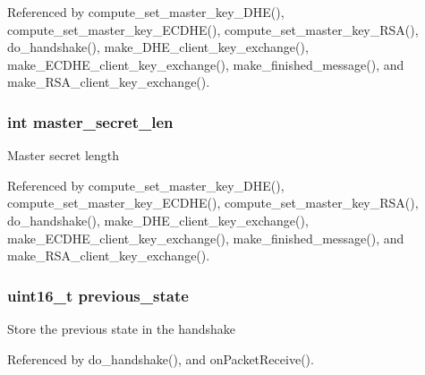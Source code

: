 Referenced by compute\+\_\+set\+\_\+master\+\_\+key\+\_\+\+D\+H\+E(), compute\+\_\+set\+\_\+master\+\_\+key\+\_\+\+E\+C\+D\+H\+E(), compute\+\_\+set\+\_\+master\+\_\+key\+\_\+\+R\+S\+A(), do\+\_\+handshake(), make\+\_\+\+D\+H\+E\+\_\+client\+\_\+key\+\_\+exchange(), make\+\_\+\+E\+C\+D\+H\+E\+\_\+client\+\_\+key\+\_\+exchange(), make\+\_\+finished\+\_\+message(), and make\+\_\+\+R\+S\+A\+\_\+client\+\_\+key\+\_\+exchange().

\subsubsection[{\texorpdfstring{master\+\_\+secret\+\_\+len}{master_secret_len}}]{\setlength{\rightskip}{0pt plus 5cm}int master\+\_\+secret\+\_\+len}\hypertarget{struct_t_l_s__parameters__t_a7112487b636ca7921055d94ae02478fe}{}\label{struct_t_l_s__parameters__t_a7112487b636ca7921055d94ae02478fe}
Master secret length 

Referenced by compute\+\_\+set\+\_\+master\+\_\+key\+\_\+\+D\+H\+E(), compute\+\_\+set\+\_\+master\+\_\+key\+\_\+\+E\+C\+D\+H\+E(), compute\+\_\+set\+\_\+master\+\_\+key\+\_\+\+R\+S\+A(), do\+\_\+handshake(), make\+\_\+\+D\+H\+E\+\_\+client\+\_\+key\+\_\+exchange(), make\+\_\+\+E\+C\+D\+H\+E\+\_\+client\+\_\+key\+\_\+exchange(), make\+\_\+finished\+\_\+message(), and make\+\_\+\+R\+S\+A\+\_\+client\+\_\+key\+\_\+exchange().

\subsubsection[{\texorpdfstring{previous\+\_\+state}{previous_state}}]{\setlength{\rightskip}{0pt plus 5cm}uint16\+\_\+t previous\+\_\+state}\hypertarget{struct_t_l_s__parameters__t_a7876cd7f12771bb13dfd180e2d74e02b}{}\label{struct_t_l_s__parameters__t_a7876cd7f12771bb13dfd180e2d74e02b}
Store the previous state in the handshake 

Referenced by do\+\_\+handshake(), and on\+Packet\+Receive().

